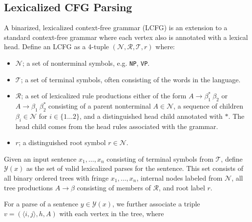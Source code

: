 \documentclass[11pt,letterpaper]{article}
\newcommand{\nonterms}{\mathcal{N}}
\newcommand{\rules}{\mathcal{R}}
\newcommand{\terms}{\mathcal{T}}
\newcommand{\Span}[1]{\langle #1 \rangle}
\newcommand{\Tag}[1]{\texttt{#1}}
\newcommand{\Root}{r}
\newcommand{\RuleA}[3]{#1 \rightarrow #2^*\ #3}
\newcommand{\RuleB}[3]{#1 \rightarrow #2\ #3^*}
\begin{document}
\subsection{Lexicalized CFG Parsing}

A binarized, lexicalized context-free grammar (LCFG) is an extension to a standard context-free grammar where each vertex also is annotated with a lexical head. Define an LCFG as a 4-tuple $(\nonterms, \rules, \terms, r)$ where:
\begin{itemize}
\item $\nonterms$; a set of nonterminal symbols, e.g. \Tag{NP}, \Tag{VP}.
\item $\terms$; a set of terminal symbols, often consisting of the words in the language.
\item $\rules$; a set of lexicalized rule productions either of the form $\RuleA{A}{\beta_1}{\beta_2}$ or $\RuleB{A}{\beta_1}{\beta_2}$  consisting of a parent nonterminal $A \in \nonterms$, a sequence of children $\beta_i \in \nonterms$ for $i \in \{1\ldots 2\}$, and a distinguished head child annotated with $*$. The head child comes from the head rules associated with the grammar.
\item $\Root$; a distinguished root symbol $\Root \in \nonterms$.
\end{itemize}

Given an input sentence $x_1, \ldots, x_n$ consisting of terminal symbols from $\terms$, define $\mathcal{Y}(x)$ as the set of valid lexicalized parses for the sentence. This set consists of all binary ordered trees with fringe $x_1, \ldots,  x_n$, internal nodes labeled from $\nonterms$, all tree productions  $A \rightarrow \beta$ consisting of members of $\rules$, and root label $\Root$.



For a parse of a sentence $y \in \mathcal{Y}(x)$,
we further associate a triple $v = (\Span{i, j}, h, A)$ with each vertex in the tree, where
\end{document}
